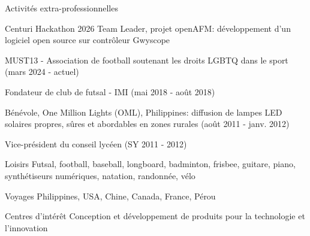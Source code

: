 
\begin{cvskills}

    \cvskill
{Activit\'es extra-professionnelles}
    {
    \begin{cvitems}
    \item Centuri Hackathon 2026 Team Leader, projet openAFM: d\'eveloppement d'un logiciel open source sur contr\^oleur Gwyscope
    \item MUST13 - Association de football soutenant les droits LGBTQ dans le sport (mars 2024 - actuel)
    \item Fondateur de club de futsal - IMI (mai 2018 - ao\^ut 2018)
    \item B\'en\'evole, One Million Lights (OML), Philippines: diffusion de lampes LED solaires propres, s\^ures et abordables en zones rurales (ao\^ut 2011 - janv. 2012)
    \item Vice-pr\'esident du conseil lyc\'een (SY 2011 - 2012)
    \end{cvitems}
    \vspace{1em}
    }

    \cvskill
{Loisirs}
    {Futsal, football, baseball, longboard, badminton, frisbee, guitare, piano, synth\'etiseurs num\'eriques, natation, randonn\'ee, v\'elo}

    \cvskill
{Voyages}
    {Philippines, USA, Chine, Canada, France, P\'erou}

    \cvskill
{Centres d'int\'er\^et}
    {Conception et d\'eveloppement de produits pour la technologie et l'innovation}

\end{cvskills}
